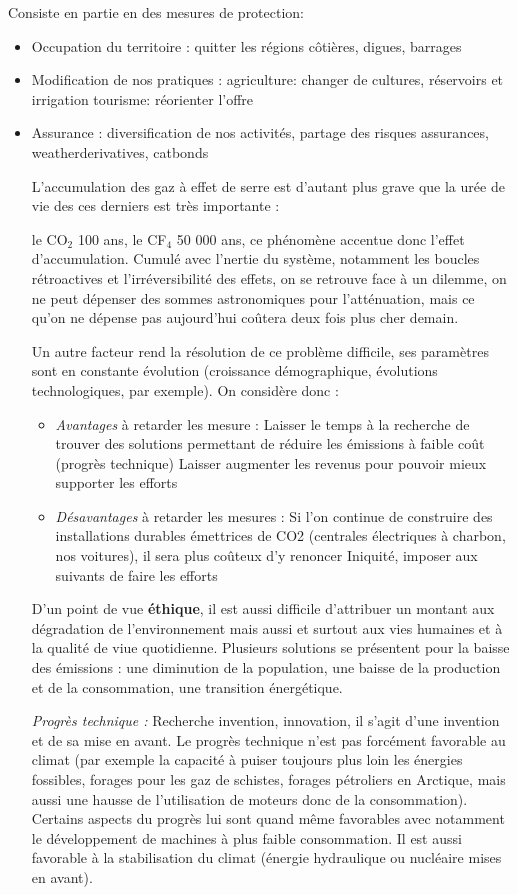 \documentclass {article}
\newcommand{\V}[0]{\vspace{1\baselineskip}}
\begin{document}
Consiste en partie en des mesures de protection:
\begin{itemize}
\item Occupation du territoire : 
\subitem quitter les régions côtières, digues, barrages
\item Modification de nos pratiques : 
\subitem agriculture: changer de cultures, réservoirs et irrigation
\subitem tourisme: réorienter l'offre
\item Assurance :
\subitem diversification de nos activités, partage des risques
\subitem assurances, weatherderivatives, catbonds

L'accumulation des gaz à effet de serre est d'autant plus grave que la urée de vie des ces derniers est très importante :

le CO$_2$ 100 ans, le CF$_4$ 50 000 ans, ce phénomène accentue donc l'effet d'accumulation. Cumulé avec l'nertie du système, notamment les boucles rétroactives et l'irréversibilité des effets, on se retrouve face à un dilemme, on ne peut dépenser des sommes astronomiques pour l'atténuation, mais ce qu'on ne dépense pas aujourd'hui coûtera deux fois plus cher demain.
\V

Un autre facteur rend la résolution de ce problème difficile, ses paramètres sont en constante évolution (croissance démographique, évolutions technologiques, par exemple). On considère donc :
\begin{itemize}
\item \emph{Avantages} à retarder les mesure :
\subitem Laisser le temps à la recherche de trouver des solutions permettant de réduire les émissions à faible coût (progrès technique)
\subitem Laisser augmenter les revenus pour pouvoir mieux supporter les efforts
\item \emph{Désavantages} à retarder les mesures :
\subitem Si l'on continue de construire des installations durables émettrices de CO2 (centrales électriques à charbon, nos voitures), il sera plus coûteux d'y renoncer
\subitem Iniquité, imposer aux suivants de faire les efforts
\end{itemize}
\V

D'un point de vue \textbf{éthique}, il est aussi difficile d'attribuer un montant aux dégradation de l'environnement mais aussi et surtout aux vies humaines et à la qualité de viue quotidienne. Plusieurs solutions se présentent pour la baisse des émissions : une diminution de la population, une baisse de la production et de la consommation, une transition énergétique.
\V

\textit{Progrès technique :} Recherche invention, innovation, il s'agit d'une invention et de sa mise en avant. Le progrès technique n'est pas forcément favorable au climat (par exemple la capacité à puiser toujours plus loin les énergies fossibles, forages pour les gaz de schistes, forages pétroliers en Arctique, mais aussi une hausse de l'utilisation de moteurs donc de la consommation). Certains aspects du progrès lui sont quand même favorables avec notamment le développement de machines à plus faible consommation. Il est aussi favorable à la stabilisation du climat (énergie hydraulique ou nucléaire mises en avant).
\V


\end{itemize}
\end{document}
